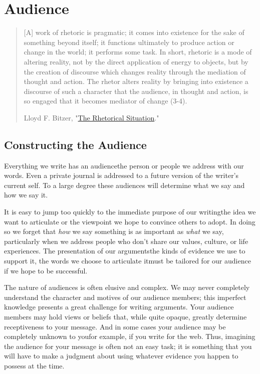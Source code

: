 \hypertarget{audience}{}

\chapter{Audience}

\begin{quote} \small [A] work of rhetoric is pragmatic; it comes into existence
for the sake of something beyond itself; it functions ultimately to produce
action or change in the world; it performs some task. In short, rhetoric is a
mode of altering reality, not by the direct application of energy to objects,
but by the creation of discourse which changes reality through the mediation of
thought and action. The rhetor alters reality by bringing into existence a
discourse of such a character that the audience, in thought and action, is so
engaged that it becomes mediator of change (3-4).

\textemdash Lloyd F. Bitzer, "\href{http://www.jstor.org/stable/40593346}{The
Rhetorical Situation}." \end{quote}

\section{Constructing the Audience}

Everything we write has an audience\textemdash the person or people we address
with our words. Even a private journal is addressed to a future version of the
writer's current self. To a large degree these audiences will determine what we say and how we say it.

It is easy to jump too quickly to the immediate purpose of our
writing\textemdash the idea we want to articulate or the viewpoint we hope to
convince others to adopt. In doing so we forget that \emph{how} we say
something is as important as \emph{what} we say, particularly when we address
people who don't share our values, culture, or life experiences. The presentation of our
arguments\textemdash the kinds of evidence we use to support it, the words we
choose to articulate it\textemdash must be tailored for our audience if we hope
to be successful.

The nature of audiences is often elusive and complex. We may never completely understand the character and motives of our audience members; this imperfect knowledge presents a great challenge for writing arguments. Your audience members may hold views or beliefs that, while quite opaque, greatly determine receptiveness to your message. And in some cases your audience may be completely unknown to you\textemdash for example, if you write for the web. Thus, imagining the audience for your message is often not an easy task; it is something that you will have to make a judgment about using whatever evidence you happen to possess at the time. 

